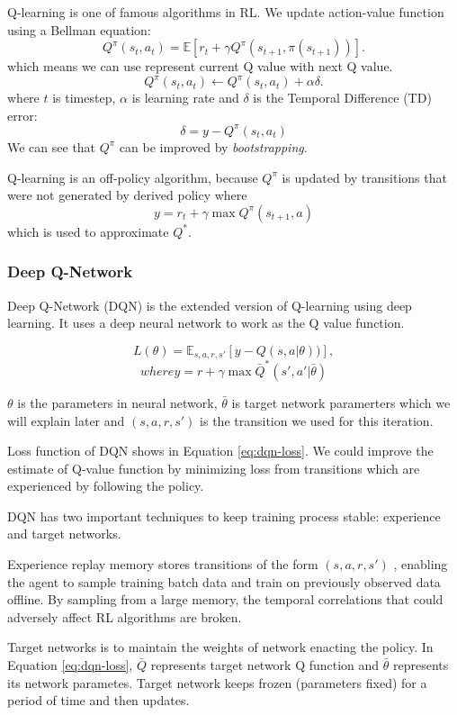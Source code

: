 \documentclass[11pt,twocolumn]{jarticle} %
\begin{document}
Q-learning is one of famous algorithms in RL. We update action-value function using a Bellman equation: 
\begin{equation}
Q^\pi(s_t, a_t) = \mathbb{E}[r_{t} + \gamma Q^\pi(s_{t+1}, \pi(s_{t+1}))].  
\end{equation}
which means we can use represent current Q value with next Q value.
\begin{equation}
Q^\pi(s_t, a_t) \leftarrow Q^\pi(s_t, a_t) + \alpha\delta.  
\end{equation}
where $t$ is timestep, $\alpha$ is learning rate and $\delta$ is the Temporal Difference (TD) error:
\begin{equation}
\delta = y - Q^\pi(s_t, a_t)
\end{equation}
We can see that $Q^\pi$ can be improved by \textsl{bootstrapping}.\par 
Q-learning is an off-policy algorithm, because $Q^\pi$ is updated by transitions that were not generated by derived policy where 
\begin{equation}
y = r_t + \gamma\max Q^\pi(s_{t+1}, a)
\end{equation}
which is used to approximate $Q^*$.

\subsubsection{Deep Q-Network\cite{dqn}}

Deep Q-Network (DQN) is the extended version of Q-learning using deep learning. It uses a deep neural network to work as the Q value function. 

\begin{equation} \label{eq:dqn-loss}
L(\theta) = \mathbb{E}_{s,a,r,s'}[y - Q(s, a|\theta))],  
\end{equation}
$$where y = r + \gamma\max \bar{Q}^*(s', a'|\bar{\theta})$$

$\theta$ is the parameters in neural network, $\bar{\theta}$ is target network paramerters which we will explain later and $(s,a,r,s')$ is the transition we used for this iteration. \par

Loss function of DQN shows in Equation \ref{eq:dqn-loss}. We could improve the estimate of Q-value function by minimizing loss from transitions which are experienced by following the policy. \par
DQN has two important techniques to keep training process stable: experience and target networks.\par
Experience replay \cite{replay} memory stores transitions of the form $(s,a,r,s')$ , enabling the agent to sample training batch data and train on previously observed data offline. By sampling from a large memory, the temporal correlations that could adversely affect RL algorithms are broken. \par
Target networks \cite{qlearning} is to maintain the weights of network enacting the policy. In Equation \ref{eq:dqn-loss}, $\bar{Q}$ represents target network Q function and $\bar{\theta}$ represents its network parametes. Target network keeps frozen (parameters fixed) for a period of time and then updates. \par
\end{document}
